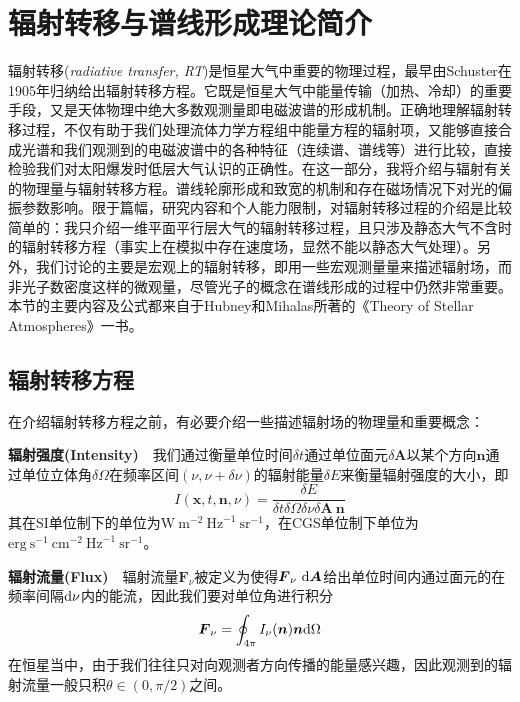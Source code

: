 \section{辐射转移与谱线形成理论简介}
辐射转移(\textit{radiative transfer, RT})是恒星大气中重要的物理过程，最早由Schuster在1905年归纳给出辐射转移方程\parencite{Schuster1905}。它既是恒星大气中能量传输（加热、冷却）的重要手段，又是天体物理中绝大多数观测量即电磁波谱的形成机制。正确地理解辐射转移过程，不仅有助于我们处理流体力学方程组中能量方程的辐射项，又能够直接合成光谱和我们观测到的电磁波谱中的各种特征（连续谱、谱线等）进行比较，直接检验我们对太阳爆发时低层大气认识的正确性。在这一部分，我将介绍与辐射有关的物理量与辐射转移方程。谱线轮廓形成和致宽的机制和存在磁场情况下对光的偏振参数影响。限于篇幅，研究内容和个人能力限制，对辐射转移过程的介绍是比较简单的：我只介绍一维平面平行层大气的辐射转移过程，且只涉及静态大气不含时的辐射转移方程（事实上在模拟中存在速度场，显然不能以静态大气处理）。另外，我们讨论的主要是宏观上的辐射转移，即用一些宏观测量量来描述辐射场，而非光子数密度这样的微观量，尽管光子的概念在谱线形成的过程中仍然非常重要。本节的主要内容及公式都来自于Hubney和Mihalas所著的《Theory of Stellar Atmospheres》一书\parencite{Mihalas2014}。
\subsection{辐射转移方程}\label{subsec:1.2.1}
在介绍辐射转移方程之前，有必要介绍一些描述辐射场的物理量和重要概念：

\noindent
\textbf{辐射强度(Intensity)}\ \ 我们通过衡量单位时间$\delta t$通过单位面元$\delta\boldsymbol{A} $以某个方向$\boldsymbol{n}$通过单位立体角$\delta \Omega$在频率区间$(\nu,\nu+\delta\nu)$的辐射能量$\delta E$来衡量辐射强度的大小，即
\begin{equation}
	I(\boldsymbol{x},t,\boldsymbol{n},\nu ) = \frac{\delta E}{\delta t  \delta \Omega \delta \nu \delta\boldsymbol{A} \  \boldsymbol{n}}
\end{equation}
其在SI单位制下的单位为$\mathrm{W}\ \mathrm{m}^{-2}\ \mathrm{Hz}^{-1}\ \mathrm{sr}^{-1}$，在CGS单位制下单位为$\mathrm{erg}\ \mathrm{s}^{-1}\ \mathrm{cm}^{-2}\ \mathrm{Hz}^{-1}\ \mathrm{sr}^{-1}$。

\noindent
\textbf{辐射流量(Flux)}\ \ 辐射流量$\boldsymbol{F}_{\nu}$被定义为使得$\boldsymbol{F}_{\nu}\ \mathrm{d} \boldsymbol{A}$给出单位时间内通过面元的在频率间隔$\mathrm{d} \nu$内的能流，因此我们要对单位角进行积分
\begin{equation}
	\boldsymbol{F}_{\nu} = \oint_{4\pi} I_{\nu}(\boldsymbol{n} )\boldsymbol{n}\mathrm{d} \Omega
\end{equation}
在恒星当中，由于我们往往只对向观测者方向传播的能量感兴趣，因此观测到的辐射流量一般只积$\theta\in (0,\pi/2)$之间。

